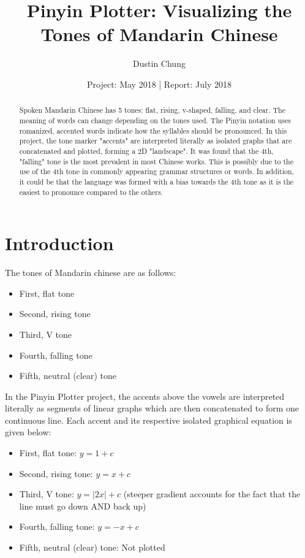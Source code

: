 \documentclass[11pt, a4paper]{article}
\begin{document}
  \title{Pinyin Plotter: Visualizing the Tones of Mandarin Chinese}
  \author{Dustin Chung}
  \date{Project: May 2018 | Report: July 2018}
  \maketitle

  \begin{abstract}
    Spoken Mandarin Chinese has 5 tones: flat, rising, v-shaped, falling, and clear. The meaning of words can change depending on the tones used. The Pinyin notation uses romanized, accented words indicate how the syllables should be pronounced. In this project, the tone marker "accents" are interpreted literally as isolated graphs that are concatenated and plotted, forming a 2D "landscape". It was found that the 4th, "falling" tone is the most prevalent in most Chinese works. This is possibly due to the use of the 4th tone in commonly appearing grammar structures or words. In addition, it could be that the language was formed with a bias towards the 4th tone as it is the easiest to pronounce compared to the others.
  \end{abstract}

  \section{Introduction}
    The tones of Mandarin chinese are as follows:
      \begin{itemize}
        \item First, flat tone
        \item Second, rising tone
        \item Third, V tone
        \item Fourth, falling tone
        \item Fifth, neutral (clear) tone
      \end{itemize}

    In the Pinyin Plotter project, the accents above the vowels are interpreted literally as segments of linear graphs which are then concatenated to form one continuous line. Each accent and its respective isolated graphical equation is given below:

    \begin{itemize}
      \item First, flat tone: $y = 1 + c$
      \item Second, rising tone: $y = x + c$
      \item Third, V tone: $y = |2x| + c$ (steeper gradient accounts for the fact that the line must go down AND back up)
      \item Fourth, falling tone: $y = -x + c$
      \item Fifth, neutral (clear) tone: Not plotted
    \end{itemize}
\end{document}
